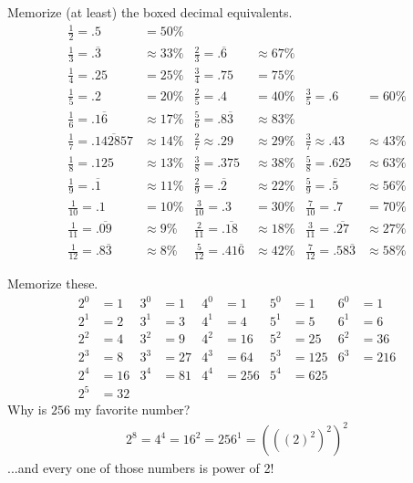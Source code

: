 \documentclass[11pt]{article}%
\begin{document}
\begin{multicols*}{2}
Memorize (at least) the boxed decimal equivalents.
{\small
\begin{align*}
\frac{1}{2} = .5 &= \boxed{50\%} \\
\frac{1}{3} = .\overline{3} &\approx \boxed{33\%} & \frac{2}{3} = .\overline{6} &\approx 67\% \\
\frac{1}{4} = .25 &= \boxed{25\%} & \frac{3}{4} = .75 &= 75\%  \\
\frac{1}{5} = .2 &= \boxed{20\%} & \frac{2}{5} = .4 &= 40\% & \frac{3}{5} = .6 &= 60\% \\
\frac{1}{6} = .1\overline{6} &\approx \boxed{17\%} & \frac{5}{6} = .8\overline{3} &\approx 83\% \\
\frac{1}{7} = .\overline{142857} &\approx \boxed{14\%} & \frac{2}{7} \approx .29 &\approx 29\% & \frac{3}{7} \approx .43 &\approx 43\% \\
\frac{1}{8} = .125 &\approx \boxed{13\%} & \frac{3}{8} = .375 &\approx 38\% & \frac{5}{8} = .625 &\approx 63\% \\
\frac{1}{9} = .\overline{1} &\approx \boxed{11\%} & \frac{2}{9} = .\overline{2} &\approx 22\% & \frac{5}{9} = .\overline{5} &\approx 56\% \\
\frac{1}{10} = .1 &= \boxed{10\%} & \frac{3}{10} = .3 &= 30\% & \frac{7}{10} = .7 &= 70\% \\
\frac{1}{11} = .\overline{09} &\approx \boxed{9\%} & \frac{2}{11} = .\overline{18} &\approx 18\% & \frac{3}{11} = .\overline{27} &\approx 27\% \\
\frac{1}{12} = .8\overline{3} &\approx \boxed{8\%} & \frac{5}{12} = .41\overline{6} &\approx 42\% & \frac{7}{12} = .58\overline{3} &\approx 58\%
\end{align*}
}%

\divider

Memorize these.
\begin{align*}
2^{0} &= 1 & 3^{0} &= 1 & 4^{0} &= 1 & 5^{0} &= 1 & 6^{0} &= 1 \\
2^{1} &= 2 & 3^{1} &= 3 & 4^{1} &= 4 & 5^{1} &= 5 & 6^{1} &= 6 \\
2^{2} &= 4 & 3^{2} &= 9 & 4^{2} &= 16 & 5^{2} &= 25 & 6^{2} &= 36 \\
2^{3} &= 8 & 3^{3} &= 27 & 4^{3} &= 64 & 5^{3} &= 125 & 6^{3} &= 216 \\
2^{4} &= 16 & 3^{4} &= 81 & 4^{4} &= 256 & 5^{4} &= 625 \\
2^{5} &= 32
\end{align*}
Why is $256$ my favorite number?
\begin{align*}
2^{8} = 4^{4} = 16^{2} = 256^{1} = \left(\left(\left( 2 \right)^{2}\right)^{2}\right)^{2}
\end{align*}
...and every one of those numbers is power of 2!


\end{multicols*}
\end{document}
